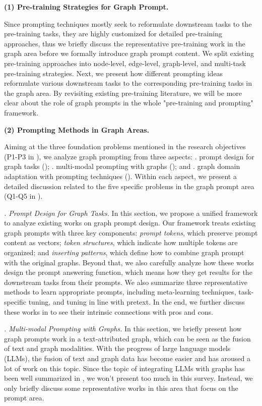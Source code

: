\textbf{(1) Pre-training Strategies for Graph Prompt.}

Since prompting techniques mostly seek to reformulate downstream tasks to the pre-training tasks, they are highly customized for detailed pre-training approaches, thus we briefly discuss the representative pre-training work in the graph area before we formally introduce graph prompt content. We split existing pre-training approaches into node-level, edge-level, graph-level, and multi-task pre-training strategies. Next, we present how different prompting ideas reformulate various downstream tasks to the corresponding pre-training tasks in the graph area. By revisiting existing pre-training literature, we will be more clear about the role of graph prompts in the whole "pre-training and prompting" framework.



\textbf{(2) Prompting Methods in Graph Areas.} 

Aiming at the three foundation problems mentioned in the research objectives (P1-P3 in ), we analyze graph prompting from three aspects: . prompt design for graph tasks (); . multi-modal prompting with graphs (); and . graph domain adaptation with prompting techniques (). Within each aspect, we present a detailed discussion related to the five specific problems in the graph prompt area (Q1-Q5 in ).

\textit{. Prompt Design for Graph Tasks.} In this section, we propose a unified framework to analyze existing works on graph prompt design. Our framework treats existing graph prompts with three key components: \textit{prompt tokens}, which preserve prompt content as vectors; \textit{token structures}, which indicate how multiple tokens are organized; and \textit{inserting patterns}, which define how to combine graph prompt with the original graphs. Beyond that, we also carefully analyze how these works design the prompt answering function, which means how they get results for the downstream tasks from their  prompts. We also summarize three representative methods to learn appropriate prompts, including meta-learning techniques, task-specific tuning, and tuning in line with pretext. In the end, we further discuss these works in  to see their intrinsic connections with pros and cons.


\textit{. Multi-modal Prompting with Graphs.} In this section, we briefly present how graph prompts work in a text-attributed graph, which can be seen as the fusion of text and graph modalities. With the progress of large language models (LLMs), the fusion of text and graph data has become easier and has aroused a lot of work on this topic. Since the topic of integrating LLMs with graphs has been well summarized in \cite{li2023survey}, we won't present too much in this survey. Instead, we only briefly discuss some representative works in this area that focus on the prompt area. 



